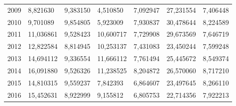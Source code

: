 \begin{table}
\begin{tabular}{p{1cm}p{2cm}p{2cm}p{2cm}p{2cm}p{2cm}p{2cm}}
 2009 &          8,821630 &                              9,383150 &  4,510850 &                                    7,092947 &                         27,231554 &                                  7,406448 \\
 2010 &          9,701089 &                              9,854805 &  5,923009 &                                    7,930837 &                         30,478644 &                                  8,224589 \\
 2011 &         11,036861 &                              9,528423 & 10,600717 &                                    7,729908 &                         29,673569 &                                  7,646719 \\
 2012 &         12,822584 &                              8,814945 & 10,253137 &                                    7,431083 &                         23,450244 &                                  7,599248 \\
 2013 &         14,694112 &                              9,336554 & 11,666112 &                                    7,761494 &                         25,445672 &                                  8,549374 \\
 2014 &         16,091880 &                              9,526326 & 11,238525 &                                    8,204872 &                         26,570060 &                                  8,717210 \\
 2015 &         14,810315 &                              9,559237 &  7,842393 &                                    6,864607 &                         23,497645 &                                  8,266110 \\
 2016 &         15,452631 &                              8,922999 &  9,155812 &                                    6,805753 &                         22,714356 &                                  7,922213 \\
\bottomrule
\end{tabular}
\end{table}
